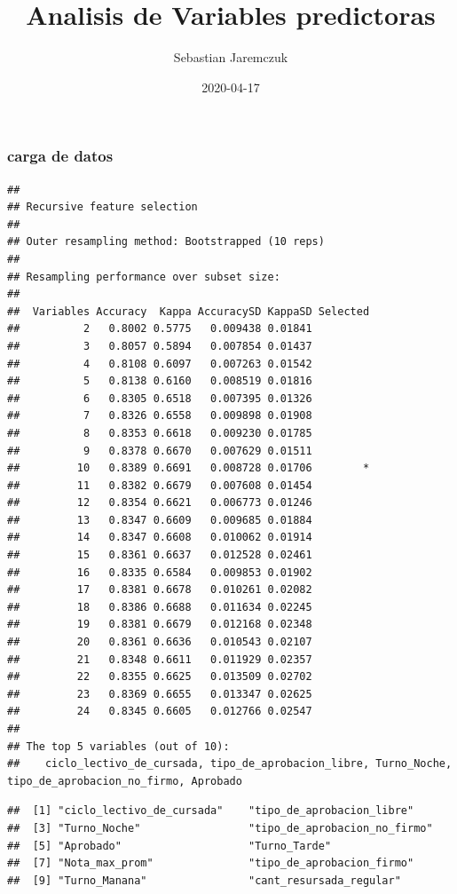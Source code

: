\documentclass[]{article}
\title{Analisis de Variables predictoras}
\author{Sebastian Jaremczuk}
\date{2020-04-17}
\begin{document}
\maketitle

\hypertarget{carga-de-datos}{%
\subsubsection{carga de datos}\label{carga-de-datos}}

\begin{lstlisting}
## 
## Recursive feature selection
## 
## Outer resampling method: Bootstrapped (10 reps) 
## 
## Resampling performance over subset size:
## 
##  Variables Accuracy  Kappa AccuracySD KappaSD Selected
##          2   0.8002 0.5775   0.009438 0.01841         
##          3   0.8057 0.5894   0.007854 0.01437         
##          4   0.8108 0.6097   0.007263 0.01542         
##          5   0.8138 0.6160   0.008519 0.01816         
##          6   0.8305 0.6518   0.007395 0.01326         
##          7   0.8326 0.6558   0.009898 0.01908         
##          8   0.8353 0.6618   0.009230 0.01785         
##          9   0.8378 0.6670   0.007629 0.01511         
##         10   0.8389 0.6691   0.008728 0.01706        *
##         11   0.8382 0.6679   0.007608 0.01454         
##         12   0.8354 0.6621   0.006773 0.01246         
##         13   0.8347 0.6609   0.009685 0.01884         
##         14   0.8347 0.6608   0.010062 0.01914         
##         15   0.8361 0.6637   0.012528 0.02461         
##         16   0.8335 0.6584   0.009853 0.01902         
##         17   0.8381 0.6678   0.010261 0.02082         
##         18   0.8386 0.6688   0.011634 0.02245         
##         19   0.8381 0.6679   0.012168 0.02348         
##         20   0.8361 0.6636   0.010543 0.02107         
##         21   0.8348 0.6611   0.011929 0.02357         
##         22   0.8355 0.6625   0.013509 0.02702         
##         23   0.8369 0.6655   0.013347 0.02625         
##         24   0.8345 0.6605   0.012766 0.02547         
## 
## The top 5 variables (out of 10):
##    ciclo_lectivo_de_cursada, tipo_de_aprobacion_libre, Turno_Noche, tipo_de_aprobacion_no_firmo, Aprobado
\end{lstlisting}

\begin{lstlisting}
##  [1] "ciclo_lectivo_de_cursada"    "tipo_de_aprobacion_libre"   
##  [3] "Turno_Noche"                 "tipo_de_aprobacion_no_firmo"
##  [5] "Aprobado"                    "Turno_Tarde"                
##  [7] "Nota_max_prom"               "tipo_de_aprobacion_firmo"   
##  [9] "Turno_Manana"                "cant_resursada_regular"
\end{lstlisting}
\end{document}
